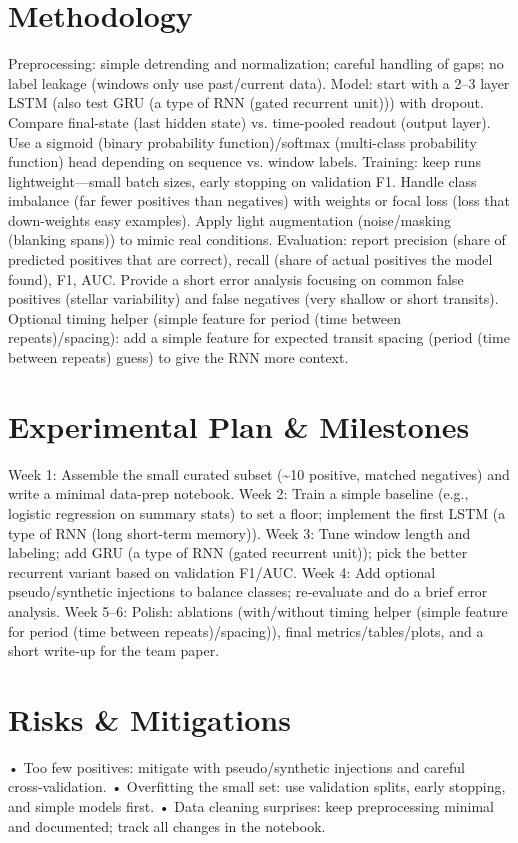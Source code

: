 \documentclass[letterpaper]{article}
\begin{document}
\section{Methodology}
Preprocessing: simple detrending and normalization; careful handling of gaps; no label leakage (windows only use past/current data).
Model: start with a 2–3 layer LSTM (also test GRU (a type of RNN (gated recurrent unit))) with dropout. Compare final-state (last hidden state) vs. time‑pooled readout (output layer). Use a sigmoid (binary probability function)/softmax (multi-class probability function) head depending on sequence vs. window labels.
Training: keep runs lightweight—small batch sizes, early stopping on validation F1. Handle class imbalance (far fewer positives than negatives) with weights or focal loss (loss that down-weights easy examples). Apply light augmentation (noise/masking (blanking spans)) to mimic real conditions.
Evaluation: report precision (share of predicted positives that are correct), recall (share of actual positives the model found), F1, AUC. Provide a short error analysis focusing on common false positives (stellar variability) and false negatives (very shallow or short transits).
Optional timing helper (simple feature for period (time between repeats)/spacing): add a simple feature for expected transit spacing (period (time between repeats) guess) to give the RNN more context.

\section{Experimental Plan \& Milestones}
Week 1: Assemble the small curated subset (\textasciitilde{}10 positive, matched negatives) and write a minimal data-prep notebook.
Week 2: Train a simple baseline (e.g., logistic regression on summary stats) to set a floor; implement the first LSTM (a type of RNN (long short-term memory)).
Week 3: Tune window length and labeling; add GRU (a type of RNN (gated recurrent unit)); pick the better recurrent variant based on validation F1/AUC.
Week 4: Add optional pseudo/synthetic injections to balance classes; re‑evaluate and do a brief error analysis.
Week 5–6: Polish: ablations (with/without timing helper (simple feature for period (time between repeats)/spacing)), final metrics/tables/plots, and a short write‑up for the team paper.

\section{Risks \& Mitigations}
• Too few positives: mitigate with pseudo/synthetic injections and careful cross‑validation.
• Overfitting the small set: use validation splits, early stopping, and simple models first.
• Data cleaning surprises: keep preprocessing minimal and documented; track all changes in the notebook.
\end{document}
